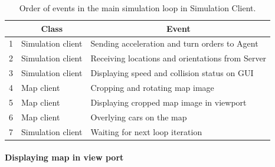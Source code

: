 \documentclass[11pt,english]{article}
\begin{document}
\begin{table}[!]
\centering
\begin{tabular}{|l|l|l|}
\hline
\multicolumn{1}{|c|}{\textbf{}} & \multicolumn{1}{c|}{\textbf{Class}} & \multicolumn{1}{c|}{\textbf{Event}}              \\ \hline
1                               & Simulation client                   & Sending acceleration and turn orders to Agent    \\ \hline
2                               & Simulation client                   & Receiving locations and orientations from Server \\ \hline
3                               & Simulation client                   & Displaying speed and collision status on GUI     \\ \hline
4                               & Map client                          & Cropping and rotating map image                  \\ \hline
5                               & Map client                          & Displaying cropped map image in viewport         \\ \hline
6                               & Map client                          & Overlying cars on the map                        \\ \hline
7                               & Simulation client                   & Waiting for next loop iteration                  \\ \hline
\end{tabular}
\caption{Order of events in the main simulation loop in Simulation Client.}
\label{table:clients_events}
\end{table}


\paragraph{Displaying map in view port}
\end{document}
